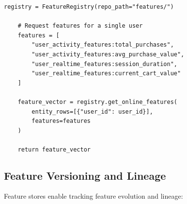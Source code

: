 \begin{lstlisting}[style=python, caption=Feature Store Implementation with Feast]
    registry = FeatureRegistry(repo_path="features/")

    # Request features for a single user
    features = [
        "user_activity_features:total_purchases",
        "user_activity_features:avg_purchase_value",
        "user_realtime_features:session_duration",
        "user_realtime_features:current_cart_value"
    ]

    feature_vector = registry.get_online_features(
        entity_rows=[{"user_id": user_id}],
        features=features
    )

    return feature_vector
\end{lstlisting}

\subsection{Feature Versioning and Lineage}

Feature stores enable tracking feature evolution and lineage:

